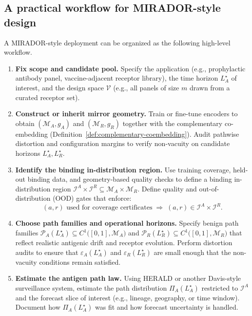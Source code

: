 \documentclass[11pt]{article}
\begin{document}
\subsection{A practical workflow for MIRADOR-style design}

A MIRADOR-style deployment can be organized as the following high-level workflow.

\begin{enumerate}
  \item \textbf{Fix scope and candidate pool.}
  Specify the application (e.g., prophylactic antibody panel, vaccine-adjacent receptor library),
  the time horizon $L_A^\star$ of interest, and the design space $\mathcal{V}$ (e.g., all panels of
  size $m$ drawn from a curated receptor set).

  \item \textbf{Construct or inherit mirror geometry.}
  Train or fine-tune encoders to obtain $(\mathcal{M}_A,g_A)$ and $(\mathcal{M}_R,g_R)$ together
  with the complementary co-embedding (Definition~\ref{def:complementary-coembedding}). Audit
  pathwise distortion and configuration margins to verify non-vacuity on candidate horizons
  $L_A^\star, L_R^\star$.

  \item \textbf{Identify the binding in-distribution region.}
  Use training coverage, held-out binding data, and geometry-based quality checks to define a
  binding in-distribution region
  $\mathcal{I}^A \times \mathcal{I}^R \subseteq \mathcal{M}_A \times \mathcal{M}_R$. Define quality
  and out-of-distribution (OOD) gates that enforce:
  \[
    (a,r) \text{ used for coverage certificates}
    \;\Longrightarrow\;
    (a,r) \in \mathcal{I}^A \times \mathcal{I}^R.
  \]

  \item \textbf{Choose path families and operational horizons.}
  Specify benign path families
  $\mathcal{P}_A(L_A^\star) \subseteq C^1\bigl([0,1],\mathcal{M}_A\bigr)$ and
  $\mathcal{P}_R(L_R^\star) \subseteq C^1\bigl([0,1],\mathcal{M}_R\bigr)$ that reflect realistic
  antigenic drift and receptor evolution. Perform distortion audits to ensure that
  $\varepsilon_A(L_A^\star)$ and $\varepsilon_R(L_R^\star)$ are small enough that the non-vacuity
  conditions remain satisfied.

  \item \textbf{Estimate the antigen path law.}
  Using HERALD or another Davis-style surveillance system, estimate the path distribution
  $\Pi_A(L_A^\star)$ restricted to $\mathcal{I}^A$ and the forecast slice of interest (e.g., lineage,
  geography, or time window). Document how $\Pi_A(L_A^\star)$ was fit and how forecast
  uncertainty is handled.


\end{enumerate}
\end{document}
